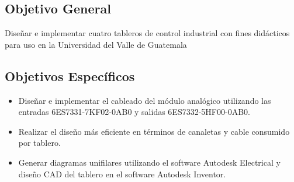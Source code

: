 \subsection*{Objetivo General}
Diseñar e implementar cuatro tableros de control industrial con fines didácticos para uso en la Universidad del Valle de Guatemala

\subsection*{Objetivos Específicos}
\begin{itemize}
\item Diseñar e implementar el cableado del módulo analógico utilizando las entradas 6ES7331-7KF02-0AB0 y salidas 6ES7332-5HF00-0AB0.
\item Realizar el diseño más eficiente en términos de canaletas y cable consumido por tablero.
\item Generar diagramas unifilares utilizando el software Autodesk Electrical y diseño CAD del tablero en el software Autodesk Inventor.
\end{itemize}